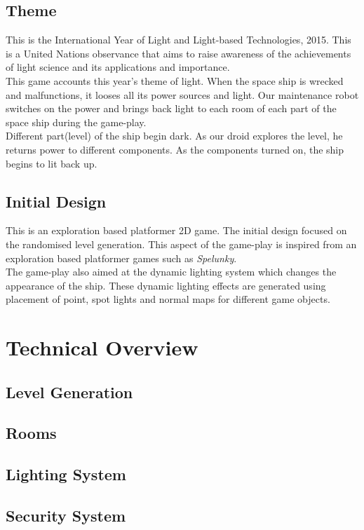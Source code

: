 \documentclass[11pt]{article}
\begin{document}
\subsection{Theme}
This is the International Year of Light and Light-based Technologies, 2015. This is a United Nations observance that aims to raise awareness of the achievements of light science and its applications and importance.\\

This game accounts this year's theme of light. When the space ship is wrecked and malfunctions, it looses all its power sources and light. Our maintenance robot switches on the power and brings back light to each room of each part of the space ship during the game-play.\\

Different part(level) of the ship begin dark. As our droid explores the level, he returns power to different components. As the components turned on, the ship begins to lit back up. 
\subsection{Initial Design}
This is an exploration based platformer 2D game. The initial design focused on the randomised level generation. This aspect of the game-play is inspired from an exploration based platformer games such as \textit{Spelunky}.\\

The game-play also aimed at the dynamic lighting system which changes the appearance of the ship. These dynamic lighting effects are generated  using placement of point, spot lights and normal maps for different game objects.
\section{Technical Overview}

\subsection{Level Generation}
\subsection{Rooms}
\subsection{Lighting System}
\subsection{Security System}
\end{document}
